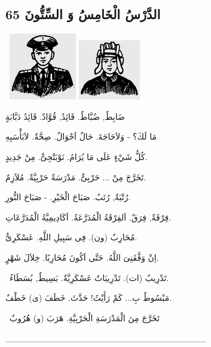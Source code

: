 \documentclass[a5paper]{article}
\begin{document}
\subsection[الدَّرْسُ الْخَامِسُ وَ السِّتُّونَ 65 ]{الدَّرْسُ الْخَامِسُ وَ السِّتُّونَ 65 }
\  \includegraphics[width=1.1563in,height=1.1457in]{images/MuhammadBagauddinprettified-img216.png}   \includegraphics[width=1.0626in,height=1.0311in]{images/MuhammadBagauddinprettified-img217.png} 

ضَابِطٌ, ضُبَّاطٌ. قَائِدٌ, قُوَّادٌ. قَائِدُ دَبَّابَةٍ

مَا لَكَ؟ - وَلاَحَاجَةَ. حَالٌ اَحْوَالٌ. صِحَّةٌ. لاَبَأْسَبِهِ

كُلُّ شَيْءٍ عَلَى مَا يُرَامُ. نَوْبَتْجِىٌّ. مِنْ جَدِيدٍ.

تَخَرَّجَ مِنْ ... حَرْبِىٌّ. مَدْرَسَةٌ حَرْبِيَّةٌ. مُلاَزِمٌ.

رُتْبَةٌ, رُتَبٌ. صَبَاحَ الْخَيْرِ. - صَبَاحَ النُّورِ. 

فِرْقَةٌ, فِرَقٌ. اَلفِرْقَةُ الْمُدَرَّعَةُ. اَكَادِيمِيَّةُ الْمُدَرَّعَاتِ.

مُحَارِبٌ (ون). فِى سَبِيلِ اللَّهِ. عَسْكَرِىٌّ. 

اِنْ وَفَّقَنِىَ اللَّهُ. حَتَّى اَكُونَ مُحَارِبًا. خِلاَلَ شَهْرٍ.

\ تَدْرِيبٌ (ات). تَدْرِيبَاتٌ عَسْكَرِيَّةٌ. بَسِيطٌ, بُسَطَاءُ.

مَبْسُوطٌ بِ... كَمْ رَأَيْتُ! حَدَّثَ. خَطَفَ (ى) خَطْفٌ.

\ تَخَرَّجَ مِنَ الْمَدْرَسَةِ الْحَرْبِيَّةِ. هَرَبَ (و) هُرُوبٌ

\_\_\_\_\_\_\_\_\_\_\_\_\_\_\_\_\_\_\_\_\_\_\_\_\_\_\_\_\_\_\_\_
\end{document}
